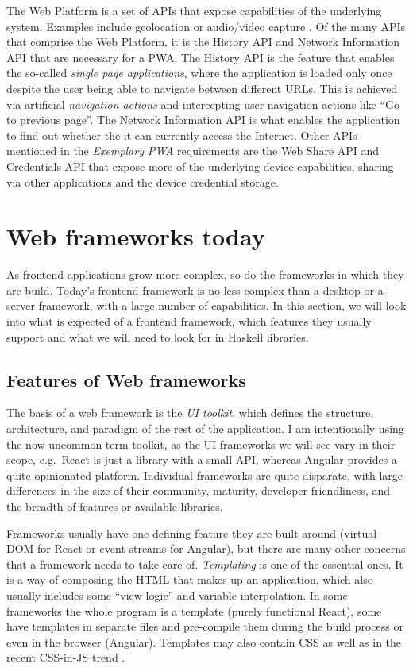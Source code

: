 \documentclass[english,zadani,odsaz]{fitthesis}
\begin{document}
The Web Platform is a set of APIs that expose capabilities of the underlying
system. Examples include geolocation or audio/video capture
\cite{what_web_can_do}. Of the many APIs that comprise the Web Platform, it is the
History API and Network Information API that are necessary for a PWA. The
History API is the feature that enables the so-called \emph{single page applications},
where the application is loaded only once despite the user being able to
navigate between different URLs. This is achieved via artificial \emph{navigation
actions} and intercepting user navigation actions like ``Go to previous page''. The
Network Information API is what enables the application to find out whether the
it can currently access the Internet. Other APIs mentioned in the \emph{Exemplary PWA}
requirements are the Web Share API and Credentials API that expose more of the
underlying device capabilities, sharing via other applications and the device
credential storage.

\chapter{Web frameworks today}
\label{sec:org557e11b}
As frontend applications grow more complex, so do the frameworks in which they
are build. Today's frontend framework is no less complex than a desktop or a
server framework, with a large number of capabilities. In this section, we will
look into what is expected of a frontend framework, which features they usually
support and what we will need to look for in Haskell libraries.

\section{Features of Web frameworks}
\label{sec:org957fed4}
The basis of a web framework is the \emph{UI toolkit}, which defines the structure,
architecture, and paradigm of the rest of the application. I am intentionally
using the now-uncommon term toolkit, as the UI frameworks we will see vary in
their scope, e.g.~React is just a library with a small API, whereas Angular
provides a quite opinionated platform. Individual frameworks are quite
disparate, with large differences in the size of their community, maturity,
developer friendliness, and the breadth of features or available libraries.

Frameworks usually have one defining feature they are built around (virtual DOM
for React or event streams for Angular), but there are many other concerns that
a framework needs to take care of. \emph{Templating} is one of the essential ones. It
is a way of composing the HTML that makes up an application, which also usually
includes some ``view logic'' and variable interpolation. In some frameworks the
whole program is a template (purely functional React), some have templates in
separate files and pre-compile them during the build process or even in the
browser (Angular). Templates may also contain CSS as well as in the recent
CSS-in-JS trend \cite{cssInJs}.
\end{document}
